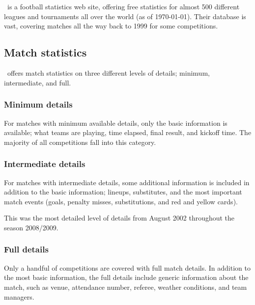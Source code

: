 \section{\whoscoredplain}

\whoscored\ is a football statistics web site, offering free statistics for almost 500 different leagues and tournaments all over the world (as of \today). Their database is vast, covering matches all the way back to 1999 for some competitions.

\subsection{Match statistics}

\whoscored\  offers match statistics on three different levels of details; minimum, intermediate, and full.

\subsubsection{Minimum details}

For matches with minimum available details, only the basic information is available; what teams are playing, time elapsed, final result, and kickoff time. The majority of all competitions fall into this category.

\subsubsection{Intermediate details}

For matches with intermediate details, some additional information is included in addition to the basic information; lineups, substitutes, and the most important match events (goals, penalty misses, substitutions, and red and yellow cards).

This was the most detailed level of details from August 2002 throughout the season 2008/2009.

\subsubsection{Full details}
\label{subsubsec:whoscored-full-details}

Only a handful of competitions are covered with full match details. In addition to the most basic information, the full details include generic information about the match, such as venue, attendance number, referee, weather conditions, and team managers.


